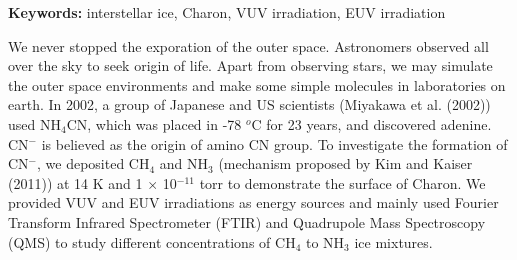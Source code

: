 \begin{abstracten}

{\bf \sf Keywords:} interstellar ice, Charon, VUV irradiation, EUV irradiation

\vspace{2em}

We never stopped the exporation of the outer space. Astronomers observed all over the sky to seek origin of life. Apart from observing stars, we may simulate the outer space environments and make some simple molecules in laboratories on earth. In 2002, a group of Japanese and US scientists (Miyakawa et al. (2002)\cite{miyakawa2002cold}) used NH$_4$CN, which was placed in -78 $^o$C for 23 years, and discovered adenine. CN$^-$ is believed as the origin of amino CN group. To investigate the formation of CN$^-$, we deposited CH$_4$ and NH$_3$ (mechanism proposed by Kim and Kaiser (2011)\cite{kim}) at 14 K and 1 $\times$ 10$^{-11}$ torr to demonstrate the surface of Charon. We provided VUV and EUV irradiations as energy sources and mainly used Fourier Transform Infrared Spectrometer (FTIR) and Quadrupole Mass Spectroscopy (QMS) to study different concentrations of CH$_4$ to NH$_3$ ice mixtures.


\end{abstracten} 

